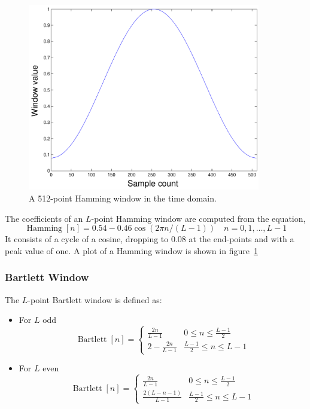\begin{figure}
\centerline{\includegraphics[width=4in]{ch-fft/ufft_hamming_w512}}
\caption{A 512-point Hamming window in the time domain.\label{fig:ufft-hmw}}
\end{figure}

The
coefficients of an $L$-point Hamming window are computed from the
equation,
\begin{equation}
\operatorname{Hamming}[n]
    = 0.54 - 0.46 \cos(2\pi n/(L-1))
          \quad n=0,1,\ldots,L-1
\label{eq:ufft-hnw}
\end{equation}
It consists of a cycle of a cosine, dropping to 0.08 at the end-points
and with a peak value of one. A plot of a Hamming window is shown in
figure~\ref{fig:ufft-hmw}

\subsubsection{Bartlett Window}

The $L$-point Bartlett window is defined as:

\begin{itemize}
\item For $L$ odd
\begin{equation}
\operatorname{Bartlett}[n]= \left\{\begin{array}{cl}
                        \frac{2n}{L-1}   & 0\le n \le \frac{L-1}{2} \\
                        2-\frac{2n}{L-1} & \frac{L-1}{2}\le n\le L-1
          \end{array}\right.
\end{equation}

\item For $L$ even
\begin{equation}
\operatorname{Bartlett}[n]= \left\{\begin{array}{cl}
                        \frac{2n}{L-1}       & 0\le n \le \frac{L-1}{2} \\
                        \frac{2(L-n-1)}{L-1} & \frac{L-1}{2}\le n\le L-1
          \end{array}\right.
\end{equation}

\end{itemize}


